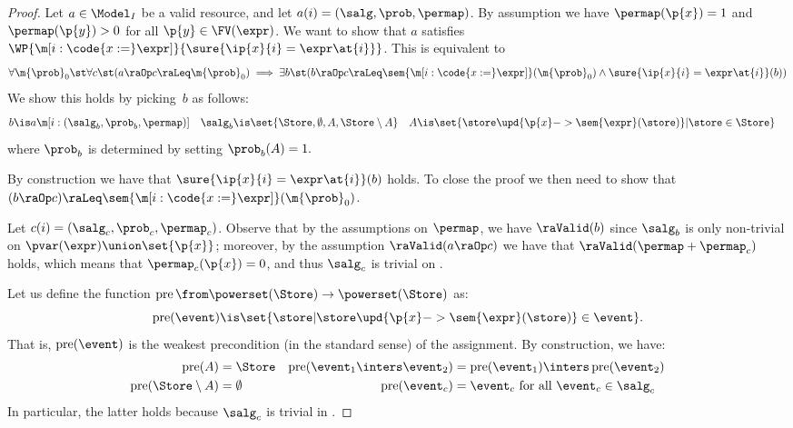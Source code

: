 \documentclass[acmsmall,nonacm,screen,appendix]{acmart}
\begin{document}
\begin{proof}
  \newcommand{\specialevent}{A}
  Let $a \in \Model_I$ be a valid resource,
  and let $a(i) = (\salg, \prob, \permap)$.
  By assumption we have
  $\permap(\p{x}) = 1$ and
  $\permap(\p{y}) > 0$ for all $ \p{y} \in \FV(\expr)$.
  We want to show that $a$ satisfies
  $\WP {\m[i: \code{x:=}\expr]} {\sure{\ip{x}{i} = \expr\at{i}}}$.
This is equivalent to
\[
    \forall \m{\prob}_0 \st
      \forall c\st
      (a\raOp c \raLeq  \m{\prob}_0)
      \implies
        \exists b\st (
          b\raOp c \raLeq  \sem{\m[i: \code{x:=}\expr]}(\m{\prob}_0) \land
          \sure{\ip{x}{i} = \expr\at{i}}(b)
        )
  \]
  We show this holds by picking~$b$ as follows:
  \begin{align*}
    b &\is a\m[i: {(\salg_b, \prob_b, \permap)}]
    &
    \salg_b &\is \set{
      \Store,\emptyset,\specialevent,\Store\setminus\specialevent
    }
    &
    \specialevent &\is \set{
      \store\upd{\p{x}->\sem{\expr}(\store)} | \store \in \Store
}
  \end{align*}
  where $\prob_b$ is determined by setting $ \prob_b(\specialevent)=1. $

  By construction we have that $\sure{\ip{x}{i} = \expr\at{i}}(b)$ holds.
  To close the proof we then need to show that
$(b \raOp c) \raLeq \sem{\m[i: \code{x:=}\expr]}(\m{\prob}_0)$.

  Let $c(i) = (\salg_c,\prob_c,\permap_c)$.
  Observe that by the assumptions on $\permap$,
  we have $\raValid(b)$ since $\salg_b$ is
  only non-trivial on $\pvar(\expr)\union\set{\p{x}}$;
  moreover, by the assumption $\raValid(a \raOp c)$
  we have that $\raValid(\permap + \permap_c)$ holds,
  which means that $\permap_c(\p{x})=0$,
  and thus $\salg_c$ is trivial on .


  \newcommand{\Pre}{\operatorname{pre}}
Let us define the function
  $
    \Pre \from \powerset(\Store) \to \powerset(\Store)
  $
  as:
  \[
    \Pre(\event) \is
      \set{ \store
          | \store\upd{\p{x}->\sem{\expr}(\store)} \in \event
        }.
  \]
  That is, $\Pre(\event)$ is the weakest precondition (in the standard sense)
  of the assignment.
  By construction, we have:
  \begin{align*}
    \Pre(\specialevent) &= \Store
    &
    \Pre(\event_1 \inters \event_2) &=
      \Pre(\event_1) \inters \Pre(\event_2)
    \\
    \Pre(\Store \setminus \specialevent) &= \emptyset
    &
    \Pre(\event_c) &= \event_c
      \text{ for all } \event_c \in \salg_c
  \end{align*}
  In particular, the latter holds because $\salg_c$ is trivial in .


\end{proof}
\end{document}
